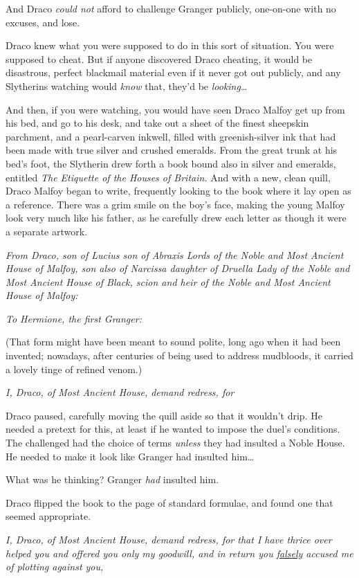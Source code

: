 And Draco \emph{could not} afford to challenge Granger publicly, one-on-one 
with no excuses, and lose.

Draco knew what you were supposed to do in this sort of situation. You were 
supposed to cheat. But if anyone discovered Draco cheating, it would be 
disastrous, perfect blackmail material even if it never got out publicly, and 
any Slytherins watching would \emph{know} that, they'd be \emph{looking}{\ldots}

And then, if you were watching, you would have seen Draco Malfoy get up from 
his bed, and go to his desk, and take out a sheet of the finest sheepskin 
parchment, and a pearl-carven inkwell, filled with greenish-silver ink that had 
been made with true silver and crushed emeralds. From the great trunk at his 
bed's foot, the Slytherin drew forth a book bound also in silver and emeralds, 
entitled \emph{The Etiquette of the Houses of Britain.} And with a new, clean 
quill, Draco Malfoy began to write, frequently looking to the book where it lay 
open as a reference. There was a grim smile on the boy's face, making the young 
Malfoy look very much like his father, as he carefully drew each letter as 
though it were a separate artwork.

\emph{From Draco, son of Lucius son of Abraxis Lords of the Noble and Most 
Ancient House of Malfoy, son also of Narcissa daughter of Druella Lady of the 
Noble and Most Ancient House of Black, scion and heir of the Noble and Most 
Ancient House of Malfoy:}

\emph{To Hermione, the first Granger:}

(That form might have been meant to sound polite, long ago when it had been 
invented; nowadays, after centuries of being used to address mudbloods, it 
carried a lovely tinge of refined venom.)

\emph{I, Draco, of Most Ancient House, demand redress, for}

Draco paused, carefully moving the quill aside so that it wouldn't drip. He 
needed a pretext for this, at least if he wanted to impose the duel's 
conditions. The challenged had the choice of terms \emph{unless} they had 
insulted a Noble House. He needed to make it look like Granger had insulted 
him{\ldots}

What was he thinking? Granger \emph{had} insulted him.

Draco flipped the book to the page of standard formulae, and found one that 
seemed appropriate.

\emph{I, Draco, of Most Ancient House, demand redress, for that I have thrice 
over helped you and offered you only my goodwill, and in return you 
\underline{falsely} accused me of plotting against you,}

